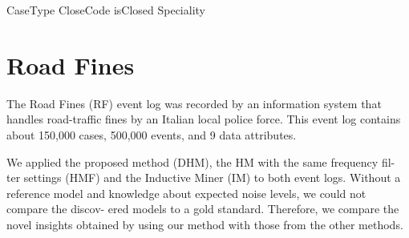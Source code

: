 CaseType
CloseCode
isClosed
Speciality


\section{Road Fines}
The Road Fines (RF) event log was recorded by an information system that handles road-traffic fines by an Italian local police force. This event log contains about 150,000 cases, 500,000 events, and 9 data attributes. 

We applied the proposed method (DHM), the HM with the same frequency fil-
ter settings (HMF) and the Inductive Miner (IM) to both event logs. 
Without a reference
model and knowledge about expected noise levels, we could not compare the discov-
ered models to a gold standard. Therefore, we compare the novel insights obtained by
using our method with those from the other methods.


 